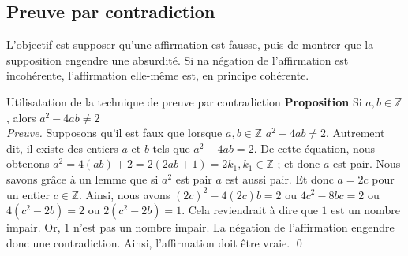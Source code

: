 \documentclass[16pt]{report}
\begin{document}
\begin{multicols*}{2}


            \section{\textbf{\textcolor{myp}{Preuve par contradiction}}}


            L'objectif est supposer qu'une affirmation est fausse, puis de montrer que la supposition engendre 
            une absurdité. Si na négation de l'affirmation est incohérente, l'affirmation elle-même est, en principe
            cohérente.


            \begin{center}
            \noindent{}
            \end{center}    


            \begin{Preuve}{Utilisatation de la technique de preuve par contradiction}{}
                \textbf{Proposition} \quad Si $a,b \in \mathbb{Z}$, alors $a^2 -4ab \neq 2$
                \vspace{1em}\\ 
                \textit{Preuve.} \quad Supposons qu'il est faux que lorsque $a, b \in \mathbb{Z}$ $a^2 -4ab \neq 2$.
                Autrement dit, il existe des entiers $a$ et $b$ tels que $a^2 -4ab = 2$. De cette équation, 
                nous obtenons $a^2 = 4(ab) +2 = 2(2ab +1) = 2k_1, k_1 \in \mathbb{Z}$ ; et donc $a$ est pair. 
                Nous savons grâce à un lemme que si $a^2$ est pair $a$ est aussi pair. Et donc $a = 2c$ pour un 
                entier $c \in \mathbb{Z}$. Ainsi, nous avons $(2c)^2 -4(2c)b = 2$ ou $4c^2 -8bc =2$ ou 
                $4(c^2 -2b) = 2$ ou $2(c^2 -2b) = 1$. Cela reviendrait à dire que $1$ est un nombre impair. Or,
                $1$ n'est pas un nombre impair. La négation de l'affirmation engendre donc une contradiction. 
                Ainsi, l'affirmation doit être vraie. \qed 
            \end{Preuve}


\end{multicols*}
\end{document}
